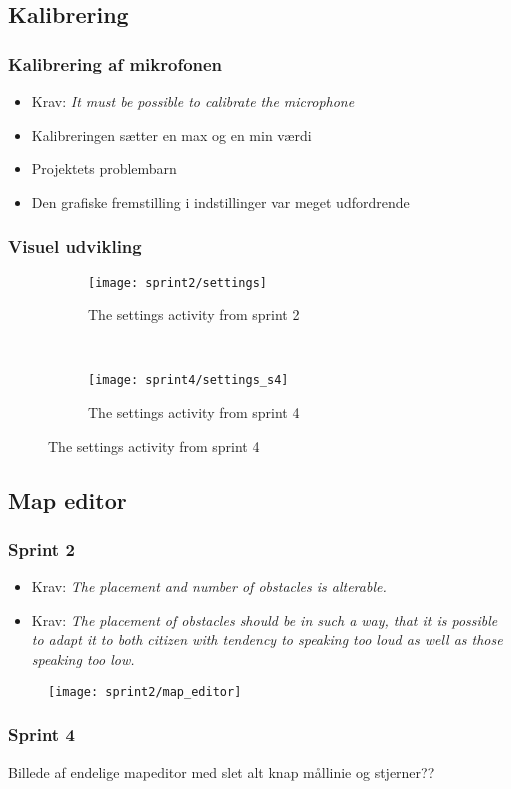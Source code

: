 \subsection{Kalibrering}
\begin{frame}
\frametitle{Kalibrering af mikrofonen}
\begin{itemize}
\item Krav: \textit{It must be possible to calibrate the microphone}
\item Kalibreringen sætter en max og en min værdi
\item Projektets problembarn
\item Den grafiske fremstilling i indstillinger var meget udfordrende
\end{itemize}
\end{frame}

\begin{frame}
\frametitle{Visuel udvikling}
\begin{figure}
\begin{subfigure}[b]{0.4\textwidth}
\texttt{[image: sprint2/settings]}
\caption{The settings activity from sprint 2}
\end{subfigure}
~
\begin{subfigure}[b]{0.4\textwidth}
\texttt{[image: sprint4/settings\_s4]}
\caption{The settings activity from sprint 4}
\end{subfigure}
\end{figure}
\end{frame}


\subsection{Map editor}
\begin{frame}
\frametitle{Sprint 2}
\begin{itemize}
\item Krav: \textit{The placement and number of obstacles is alterable.}
\item Krav: \textit{The placement of obstacles should be
in such a way,
that it is possible to adapt it to both citizen
with tendency to speaking too loud
as well as those speaking too low.}
\end{itemize}
\begin{figure}[h]
\texttt{[image: sprint2/map\_editor]}
\end{figure}
\end{frame}

\begin{frame}
\frametitle{Sprint 4}
Billede af endelige mapeditor med slet alt knap mållinie og stjerner??
\end{frame}

